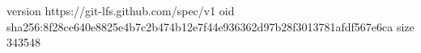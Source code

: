 version https://git-lfs.github.com/spec/v1
oid sha256:8f28ce640e8825e4b7c2b474b12e7f44e936362d97b28f3013781afdf567e6ca
size 343548
